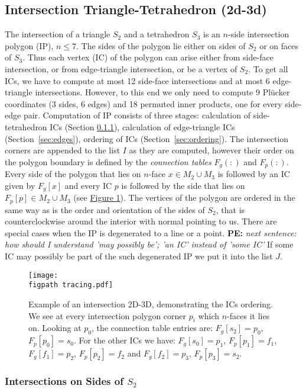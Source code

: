 \documentclass{elsarticle}
\newcommand{\fig}[1]{\hyperref[#1]{Figure \ref{#1}}}
\newcommand{\figpath}{figures/}
\newcommand{\notePE}[1]{{\color{Orange} \textbf{PE: } \textit{#1}}}
\newcommand{\plucker}{Pl\"{u}cker }
\newcommand{\nface}{$n$-face }
\newcommand{\nfaces}{$n$-faces }
\begin{document}
\subsection{Intersection Triangle-Tetrahedron (2d-3d)}
The intersection of a triangle $S_2$ and a tetrahedron $S_3$ is an $n$-side intersection polygon (IP), $n\le 7$. The sides of the polygon
lie either on sides of $S_2$ or on faces of $S_3$. Thus each vertex (IC) of the polygon
can arise either from side-face intersection, or from edge-triangle intersection, or be a vertex of $S_2$.
To get all ICs, we have to compute at most 12 side-face intersections and at most 6 edge-triangle intersections. However,
to this end we only need to compute 9 \plucker coordinates (3 sides, 6 edges) and 18 permuted inner products, one for every side-edge pair.
Computation of IP consists of three stages: calculation of side-tetrahedron ICs (Section \ref{sec:sides}), 
calculation of edge-triangle ICs (Section~\ref{sec:edges}), ordering of ICs (Section~\ref{sec:ordering}).
The intersection corners are appended to the list $I$ as they are computed, however their order on the polygon boundary is 
defined by the \emph{connection tables} $F_g(:)$ and $F_p(:)$. Every side of the polygon that lies on \nface $x\in M_2\cup M_3$ is followed by an IC given by $F_g[x]$ 
and every IC $p$ is followed by the side that lies on $F_p[p]\in M_2\cup M_3$ (see \fig{fig:tracing}). The vertices of the polygon are ordered in the same 
way as is the order and orientation of the sides of $S_2$, that is counterclockwise around the interior with normal pointing to us.
There are special cases when the IP is degenerated to a line or a point. 
\notePE{next sentence: how should I understand 'may possibly be'; 'an IC' instead of 'some IC'}
If some IC may possibly be part of the such degenerated IP we put it into the list $J$. 

\begin{figure}[!htb]
    \centering    
    \texttt{[image: \\figpath tracing.pdf]}
    \caption{Example of an intersection 2D-3D, demonstrating the ICs ordering. We see at every 
    intersection polygon corner $p_i$ which \nfaces it lies on. Looking at $p_0$, the connection table entries
    are: $F_g[s_2]=p_0$, $F_p[p_0]=s_0$. For the other ICs we have: $F_g[s_0]=p_1$, $F_p[p_1]=f_1$, $F_g[f_1]=p_2$, $F_p[p_2]=f_2$ and $F_g[f_2]=p_3$, $F_p[p_3]=s_2$.}
    \label{fig:tracing}
\end{figure}

\subsubsection{Intersections on Sides of $S_2$}
\label{sec:sides}
\end{document}
